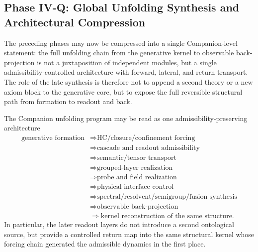 \subsection*{Phase IV-Q: Global Unfolding Synthesis and Architectural Compression}

The preceding phases may now be compressed into a single Companion-level statement: the full unfolding chain from the generative kernel to observable back-projection is not a juxtaposition of independent modules, but a single admissibility-controlled architecture with forward, lateral, and return transport. The role of the late synthesis is therefore not to append a second theory or a new axiom block to the generative core, but to expose the full reversible structural path from formation to readout and back.

\begin{proposition}\label{prop:global_unfolding_synthesis}
The Companion unfolding program may be read as one admissibility-preserving architecture
\[
\begin{aligned}
\text{generative formation}
&\Longrightarrow \text{HC/closure/confinement forcing}\\
&\Longrightarrow \text{cascade and readout admissibility}\\
&\Longrightarrow \text{semantic/tensor transport}\\
&\Longrightarrow \text{grouped-layer realization}\\
&\Longrightarrow \text{probe and field realization}\\
&\Longrightarrow \text{physical interface control}\\
&\Longrightarrow \text{spectral/resolvent/semigroup/fusion synthesis}\\
&\Longrightarrow \text{observable back-projection}\\
&\Longrightarrow \text{kernel reconstruction of the same structure}.
\end{aligned}
\]
In particular, the later readout layers do not introduce a second ontological source, but provide a controlled return map into the same structural kernel whose forcing chain generated the admissible dynamics in the first place.
\end{proposition}

